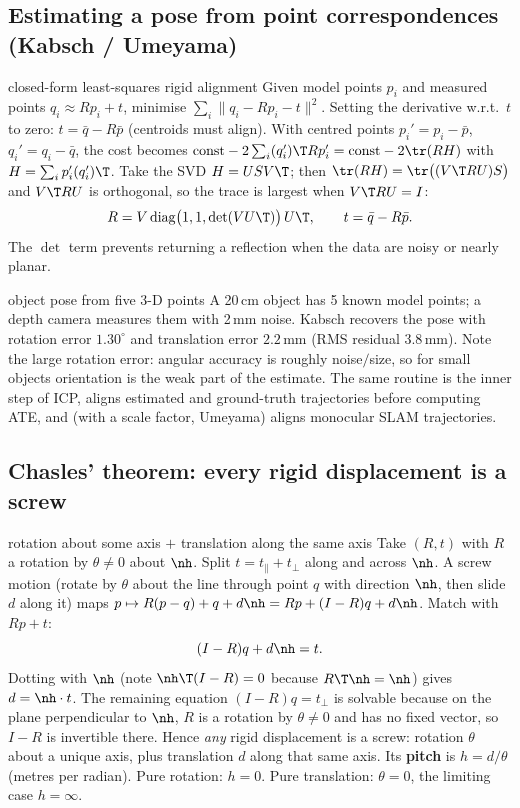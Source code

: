 \subsection{Estimating a pose from point correspondences (Kabsch / Umeyama)}\label{sec:rot:estimating-pose-point}
\begin{deriv}{closed-form least-squares rigid alignment}
Given model points $p_i$ and measured points $q_i\approx Rp_i+t$, minimise $\sum_i\|q_i-Rp_i-t\|^2$. Setting the derivative w.r.t.\ $t$ to zero: $t=\bar q-R\bar p$ (centroids must align). With centred points $p_i'=p_i-\bar p$, $q_i'=q_i-\bar q$, the cost becomes $\text{const}-2\sum_i(q_i')\T Rp_i'=\text{const}-2\tr(RH)$ with $H=\sum_ip_i'(q_i')\T$. Take the SVD $H=USV\T$; then $\tr(RH)=\tr\big((V\T RU)S\big)$ and $V\T RU$ is orthogonal, so the trace is largest when $V\T RU=I$:
\[
R=V\,\mathrm{diag}\big(1,1,\det(VU\T)\big)\,U\T,\qquad t=\bar q-R\bar p.
\]
The $\det$ term prevents returning a reflection when the data are noisy or nearly planar.
\end{deriv}
\begin{example}{object pose from five 3-D points}
A 20\,cm object has 5 known model points; a depth camera measures them with 2\,mm noise. Kabsch recovers the pose with rotation error $1.30^\circ$ and translation error $2.2$\,mm (RMS residual 3.8\,mm). Note the large rotation error: angular accuracy is roughly noise$/$size, so for small objects orientation is the weak part of the estimate. The same routine is the inner step of ICP, aligns estimated and ground-truth trajectories before computing ATE, and (with a scale factor, Umeyama) aligns monocular SLAM trajectories.
\end{example}

\subsection{Chasles' theorem: every rigid displacement is a screw}\label{sec:rot:chasles-theorem-every}
\begin{deriv}{rotation about some axis $+$ translation along the same axis}
Take $(R,t)$ with $R$ a rotation by $\theta\neq0$ about $\nh$. Split $t=t_\parallel+t_\perp$ along and across $\nh$. A screw motion (rotate by $\theta$ about the line through point $q$ with direction $\nh$, then slide $d$ along it) maps $p\mapsto R(p-q)+q+d\nh=Rp+(I-R)q+d\nh$. Match with $Rp+t$:
\[
(I-R)q+d\nh=t .
\]
Dotting with $\nh$ (note $\nh\T(I-R)=0$ because $R\T\nh=\nh$) gives $d=\nh\cdot t$. The remaining equation $(I-R)q=t_\perp$ is solvable because on the plane perpendicular to $\nh$, $R$ is a rotation by $\theta\neq0$ and has no fixed vector, so $I-R$ is invertible there. Hence \emph{any} rigid displacement is a screw: rotation $\theta$ about a unique axis, plus translation $d$ along that same axis. Its \textbf{pitch} is $h=d/\theta$ (metres per radian). Pure rotation: $h=0$. Pure translation: $\theta=0$, the limiting case $h=\infty$.
\end{deriv}

